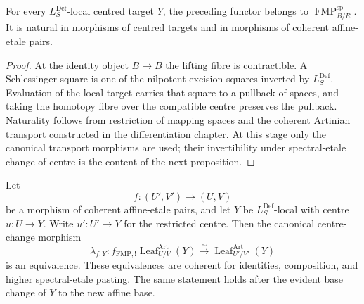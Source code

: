 \begin{proposition}
\label{prop:bnli-artinian-leaf-fmp}
For every $L_S^{\mathrm{Def}}$-local centred target $Y$, the preceding functor
belongs to $\operatorname{FMP}^{\mathrm{sp}}_{B/R}$.  It is natural in
morphisms of centred targets and in morphisms of coherent affine-etale pairs.
\end{proposition}

\begin{proof}
At the identity object $B\to B$ the lifting fibre is contractible.  A
Schlessinger square is one of the nilpotent-excision squares inverted by
$L_S^{\mathrm{Def}}$.  Evaluation of the local target carries that square to a
pullback of spaces, and taking the homotopy fibre over the compatible centre
preserves the pullback.  Naturality follows from restriction of mapping spaces
and the coherent Artinian transport constructed in the differentiation
chapter.  At this stage only the canonical transport morphisms are used; their
invertibility under spectral-etale change of centre is the content of the next
proposition.
\end{proof}

\begin{proposition}
\label{prop:bnli-artinian-leaf-etale}
Let
\[
    f:(U',V')\longrightarrow(U,V)
\]
be a morphism of coherent affine-etale pairs, and let $Y$ be
$L_S^{\mathrm{Def}}$-local with centre $u:U\to Y$.  Write $u':U'\to Y$ for
the restricted centre.  Then the canonical centre-change morphism
\[
\boxed{
    \lambda_{f,Y}:
    f_{\mathrm{FMP},!}
    \operatorname{Leaf}^{\mathrm{Art}}_{U/V}(Y)
    \xrightarrow{\sim}
    \operatorname{Leaf}^{\mathrm{Art}}_{U'/V'}(Y)}
\]
is an equivalence.  These equivalences are coherent for identities,
composition, and higher spectral-etale pasting.  The same statement holds
after the evident base change of $Y$ to the new affine base.
\end{proposition}

